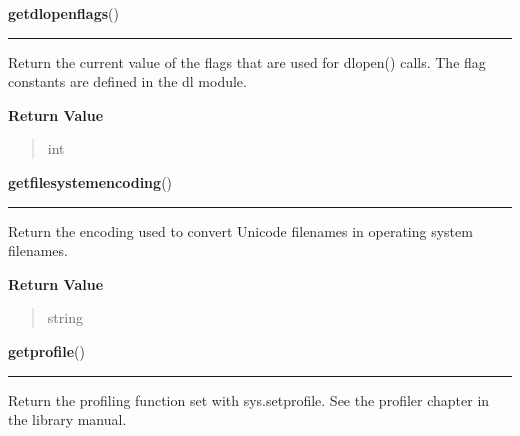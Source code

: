 \hspace{.8\funcindent}\begin{boxedminipage}{\funcwidth}

    \raggedright \textbf{getdlopenflags}()

    \vspace{-1.5ex}

    \rule{\textwidth}{0.5\fboxrule}
\setlength{\parskip}{2ex}
    Return the current value of the flags that are used for dlopen() calls.
    The flag constants are defined in the dl module.

\setlength{\parskip}{1ex}
      \textbf{Return Value}
    \vspace{-1ex}

      \begin{quote}
      int

      \end{quote}

    \end{boxedminipage}

    \label{sys:getfilesystemencoding}

    \vspace{0.5ex}

\hspace{.8\funcindent}\begin{boxedminipage}{\funcwidth}

    \raggedright \textbf{getfilesystemencoding}()

    \vspace{-1.5ex}

    \rule{\textwidth}{0.5\fboxrule}
\setlength{\parskip}{2ex}
    Return the encoding used to convert Unicode filenames in operating 
    system filenames.

\setlength{\parskip}{1ex}
      \textbf{Return Value}
    \vspace{-1ex}

      \begin{quote}
      string

      \end{quote}

    \end{boxedminipage}

    \label{sys:getprofile}

    \vspace{0.5ex}

\hspace{.8\funcindent}\begin{boxedminipage}{\funcwidth}

    \raggedright \textbf{getprofile}()

    \vspace{-1.5ex}

    \rule{\textwidth}{0.5\fboxrule}
\setlength{\parskip}{2ex}
    Return the profiling function set with sys.setprofile. See the profiler
    chapter in the library manual.

\setlength{\parskip}{1ex}
    \end{boxedminipage}

